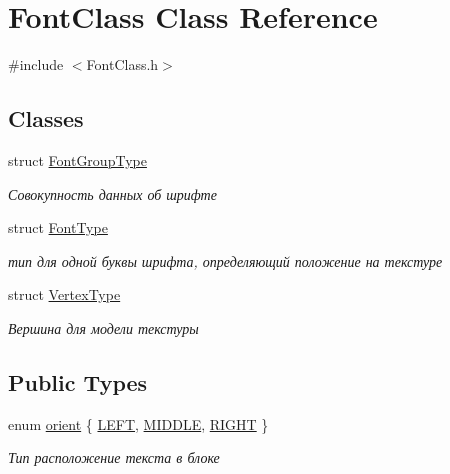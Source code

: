 \hypertarget{class_font_class}{}\section{Font\+Class Class Reference}
\label{class_font_class}


{\ttfamily \#include $<$Font\+Class.\+h$>$}

\subsection*{Classes}
\begin{DoxyCompactItemize}
\item 
struct \hyperlink{struct_font_class_1_1_font_group_type}{Font\+Group\+Type}
\begin{DoxyCompactList}\small\item\em Совокупность данных об шрифте \end{DoxyCompactList}\item 
struct \hyperlink{struct_font_class_1_1_font_type}{Font\+Type}
\begin{DoxyCompactList}\small\item\em тип для одной буквы шрифта, определяющий положение на текстуре \end{DoxyCompactList}\item 
struct \hyperlink{struct_font_class_1_1_vertex_type}{Vertex\+Type}
\begin{DoxyCompactList}\small\item\em Вершина для модели текстуры \end{DoxyCompactList}\end{DoxyCompactItemize}
\subsection*{Public Types}
\begin{DoxyCompactItemize}
\item 
enum \hyperlink{class_font_class_a66bce9a04891356d0db3e0115ea6971a}{orient} \{ \hyperlink{class_font_class_a66bce9a04891356d0db3e0115ea6971aa5eda55c47b67105cd9cc24834abb7986}{L\+E\+FT}, 
\hyperlink{class_font_class_a66bce9a04891356d0db3e0115ea6971aae71d76795a3a94ff2d8df1c8a2ea5e59}{M\+I\+D\+D\+LE}, 
\hyperlink{class_font_class_a66bce9a04891356d0db3e0115ea6971aaa31503a07318325e995394f1a4fcc69e}{R\+I\+G\+HT}
 \}\begin{DoxyCompactList}\small\item\em Тип расположение текста в блоке \end{DoxyCompactList}
\end{DoxyCompactItemize}
